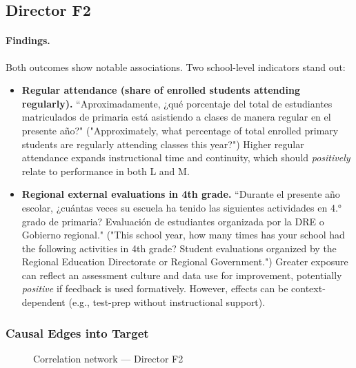 \documentclass[11pt, a4paper]{article}
\begin{document}
\subsection{Director F2}
\paragraph{Findings.}
Both outcomes show notable associations. Two school-level indicators stand out:
\begin{itemize}
  \item \textbf{Regular attendance (share of enrolled students attending regularly).} ``Aproximadamente, ¿qué porcentaje del total de estudiantes matriculados de primaria está asistiendo a clases de manera regular en el presente año?" ("Approximately, what percentage of total enrolled primary students are regularly attending classes this year?") Higher regular attendance expands instructional time and continuity, which should \emph{positively} relate to performance in both L and M.
  \item \textbf{Regional external evaluations in 4th grade.} ``Durante el presente año escolar, ¿cuántas veces su escuela ha tenido las siguientes actividades en 4.° grado de primaria? Evaluación de estudiantes organizada por la DRE o Gobierno regional." ("This school year, how many times has your school had the following activities in 4th grade? Student evaluations organized by the Regional Education Directorate or Regional Government.") Greater exposure can reflect an assessment culture and data use for improvement, potentially \emph{positive} if feedback is used formatively. However, effects can be context-dependent (e.g., test-prep without instructional support).
\end{itemize}

\subsubsection*{Causal Edges into Target}
\begin{figure}[h]
  \centering
  \caption{Correlation network — Director F2}
\end{figure}
\end{document}
